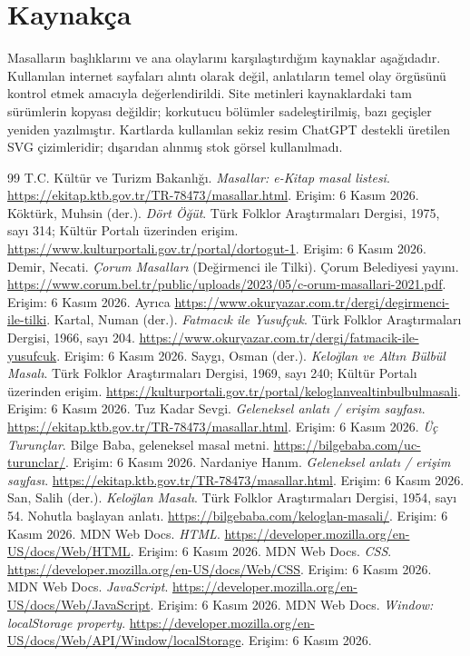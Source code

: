 \documentclass[12pt,a4paper]{article}
\begin{document}
\section{Kaynakça}
Masalların başlıklarını ve ana olaylarını karşılaştırdığım kaynaklar aşağıdadır. Kullanılan internet sayfaları alıntı olarak değil, anlatıların temel olay örgüsünü kontrol etmek amacıyla değerlendirildi. Site metinleri kaynaklardaki tam sürümlerin kopyası değildir; korkutucu bölümler sadeleştirilmiş, bazı geçişler yeniden yazılmıştır. Kartlarda kullanılan sekiz resim ChatGPT destekli üretilen SVG çizimleridir; dışarıdan alınmış stok görsel kullanılmadı.
\begin{thebibliography}{99}
 T.C. Kültür ve Turizm Bakanlığı. \emph{Masallar: e-Kitap masal listesi}. \url{https://ekitap.ktb.gov.tr/TR-78473/masallar.html}. Erişim: 6 Kasım 2026.
 Köktürk, Muhsin (der.). \emph{Dört Öğüt}. Türk Folklor Araştırmaları Dergisi, 1975, sayı 314; Kültür Portalı üzerinden erişim. \url{https://www.kulturportali.gov.tr/portal/dortogut-1}. Erişim: 6 Kasım 2026.
 Demir, Necati. \emph{Çorum Masalları} (Değirmenci ile Tilki). Çorum Belediyesi yayını. \url{https://www.corum.bel.tr/public/uploads/2023/05/c-orum-masallari-2021.pdf}. Erişim: 6 Kasım 2026. Ayrıca \url{https://www.okuryazar.com.tr/dergi/degirmenci-ile-tilki}.
 Kartal, Numan (der.). \emph{Fatmacık ile Yusufçuk}. Türk Folklor Araştırmaları Dergisi, 1966, sayı 204. \url{https://www.okuryazar.com.tr/dergi/fatmacik-ile-yusufcuk}. Erişim: 6 Kasım 2026.
 Saygı, Osman (der.). \emph{Keloğlan ve Altın Bülbül Masalı}. Türk Folklor Araştırmaları Dergisi, 1969, sayı 240; Kültür Portalı üzerinden erişim. \url{https://kulturportali.gov.tr/portal/keloglanvealtinbulbulmasali}. Erişim: 6 Kasım 2026.
 Tuz Kadar Sevgi. \emph{Geleneksel anlatı / erişim sayfası}. \url{https://ekitap.ktb.gov.tr/TR-78473/masallar.html}. Erişim: 6 Kasım 2026.
 \emph{Üç Turunçlar}. Bilge Baba, geleneksel masal metni. \url{https://bilgebaba.com/uc-turunclar/}. Erişim: 6 Kasım 2026.
 Nardaniye Hanım. \emph{Geleneksel anlatı / erişim sayfası}. \url{https://ekitap.ktb.gov.tr/TR-78473/masallar.html}. Erişim: 6 Kasım 2026.
 San, Salih (der.). \emph{Keloğlan Masalı}. Türk Folklor Araştırmaları Dergisi, 1954, sayı 54. Nohutla başlayan anlatı. \url{https://bilgebaba.com/keloglan-masali/}. Erişim: 6 Kasım 2026.
 MDN Web Docs. \emph{HTML}. \url{https://developer.mozilla.org/en-US/docs/Web/HTML}. Erişim: 6 Kasım 2026.
 MDN Web Docs. \emph{CSS}. \url{https://developer.mozilla.org/en-US/docs/Web/CSS}. Erişim: 6 Kasım 2026.
 MDN Web Docs. \emph{JavaScript}. \url{https://developer.mozilla.org/en-US/docs/Web/JavaScript}. Erişim: 6 Kasım 2026.
 MDN Web Docs. \emph{Window: localStorage property}. \url{https://developer.mozilla.org/en-US/docs/Web/API/Window/localStorage}. Erişim: 6 Kasım 2026.
\end{thebibliography}
\end{document}
